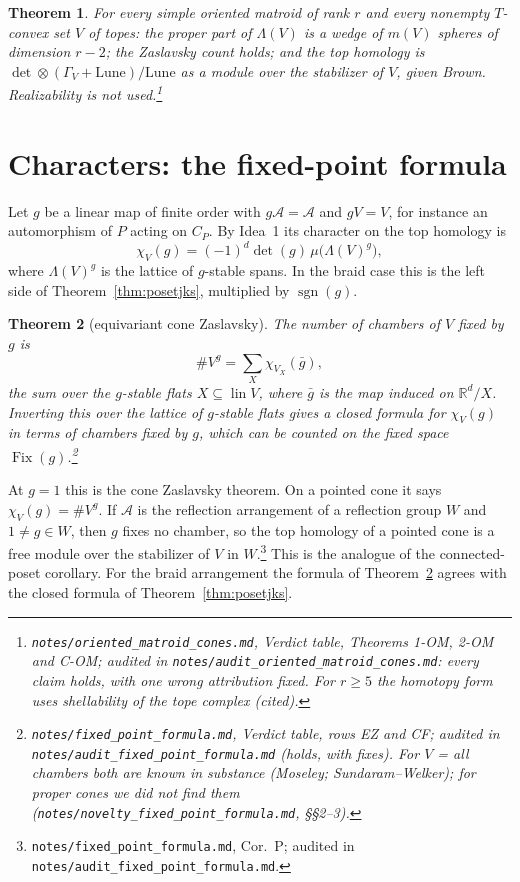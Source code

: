 \documentclass[11pt]{article}
\newtheorem{theorem}{Theorem}
\theoremstyle{definition}
\theoremstyle{remark}
\newcommand{\sgn}{\operatorname{sgn}}
\newcommand{\Fix}{\operatorname{Fix}}
\newcommand{\lin}{\operatorname{lin}}
\newcommand{\Lune}{\mathrm{Lune}}
\newcommand{\src}[1]{\nolinkurl{#1}}
\newcommand{\tagbox}[1]{\leavevmode\marginpar{\raggedright\fbox{\parbox{0.66in}{\centering\scriptsize\sffamily #1}}}}
\newcommand{\PROVEN}{\tagbox{PROVEN\\AUDITED}}
\begin{document}
\begin{theorem}\PROVEN
For every simple oriented matroid of rank $r$ and every nonempty $T$-convex
set $V$ of topes: the proper part of $\Lambda(V)$ is a wedge of $m(V)$ spheres
of dimension $r-2$; the Zaslavsky count holds; and the top homology is
$\det\otimes(\Gamma_V+\Lune)/\Lune$ as a module over the stabilizer of $V$,
given Brown. Realizability is not used.\footnote{%
\src{notes/oriented_matroid_cones.md}, Verdict table, Theorems 1-OM, 2-OM and
C-OM; audited in \src{notes/audit_oriented_matroid_cones.md}: every claim
holds, with one wrong attribution fixed. For $r\ge5$ the homotopy form uses
shellability of the tope complex (cited).}
\end{theorem}

\section{Characters: the fixed-point formula}

Let $g$ be a linear map of finite order with $g\mathcal A=\mathcal A$ and
$gV=V$, for instance an automorphism of $P$ acting on $C_P$. By Idea~1 its
character on the top homology is
\[
\chi_V(g)=(-1)^d\det(g)\,\mu\bigl(\Lambda(V)^g\bigr),
\]
where $\Lambda(V)^g$ is the lattice of $g$-stable spans. In the braid case
this is the left side of Theorem~\ref{thm:posetjks}, multiplied by
$\sgn(g)$.

\begin{theorem}[equivariant cone Zaslavsky]\label{thm:EZ}\PROVEN
The number of chambers of $V$ fixed by $g$ is
\[
\#V^g=\sum_{X}\chi_{V_X}(\bar g),
\]
the sum over the $g$-stable flats $X\subseteq\lin V$, where $\bar g$ is the
map induced on $\mathbb R^d/X$. Inverting this over the lattice of $g$-stable
flats gives a closed formula for $\chi_V(g)$ in terms of chambers fixed by
$g$, which can be counted on the fixed space $\Fix(g)$.\footnote{%
\src{notes/fixed_point_formula.md}, Verdict table, rows EZ and CF; audited
in \src{notes/audit_fixed_point_formula.md} (holds, with fixes). For $V$ =
all chambers both are known in substance (Moseley; Sundaram--Welker); for
proper cones we did not find them (\src{notes/novelty_fixed_point_formula.md},
\S\S2--3).}
\end{theorem}

At $g=1$ this is the cone Zaslavsky theorem. On a pointed cone it says
$\chi_V(g)=\#V^g$. If $\mathcal A$ is the reflection arrangement of a
reflection group $W$ and $1\ne g\in W$, then $g$ fixes no chamber, so the top
homology of a pointed cone is a free module over the stabilizer of $V$ in
$W$.\footnote{\src{notes/fixed_point_formula.md}, Cor.~P; audited in
\src{notes/audit_fixed_point_formula.md}.}\PROVEN{} This is the analogue of
the connected-poset corollary. For the braid arrangement the formula of
Theorem~\ref{thm:EZ} agrees with the closed formula of
Theorem~\ref{thm:posetjks}.
\end{document}
